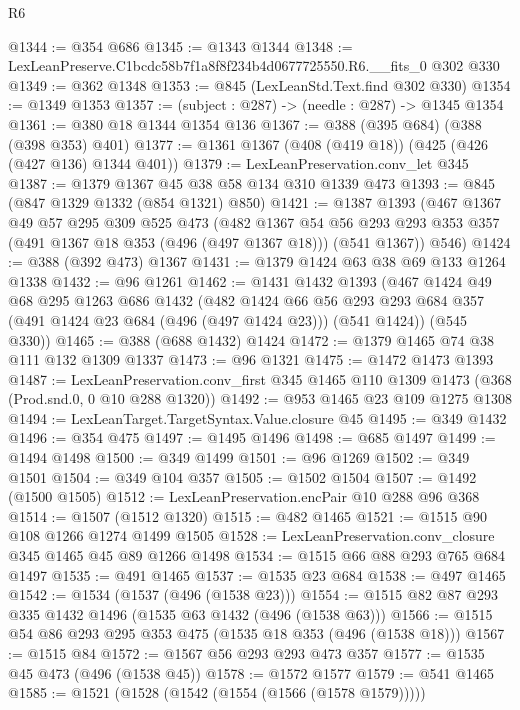 \begin{lexlean}{R6}
\begin{coremodule}
@1344 := @354 @686
@1345 := @1343 @1344
@1348 := LexLeanPreserve.C1bcdc58b7f1a8f8f234b4d0677725550.R6.__fits_0 @302 @330
@1349 := @362 @1348
@1353 := @845 (LexLeanStd.Text.find @302 @330)
@1354 := @1349 @1353
@1357 := (subject : @287) -> (needle : @287) -> @1345 @1354
@1361 := @380 @18 @1344 @1354 @136
@1367 := @388 (@395 @684) (@388 (@398 @353) @401)
@1377 := @1361 @1367 (@408 (@419 @18)) (@425 (@426 (@427 @136) @1344 @401))
@1379 := LexLeanPreservation.conv_let @345
@1387 := @1379 @1367 @45 @38 @58 @134 @310 @1339 @473
@1393 := @845 (@847 @1329 @1332 (@854 @1321) @850)
@1421 := @1387
    @1393
    (@467
      @1367
      @49
      @57
      @295
      @309
      @525
      @473
      (@482
        @1367
        @54
        @56
        @293
        @293
        @353
        @357
        (@491 @1367 @18 @353 (@496 (@497 @1367 @18)))
        (@541 @1367))
      @546)
@1424 := @388 (@392 @473) @1367
@1431 := @1379 @1424 @63 @38 @69 @133 @1264 @1338
@1432 := @96 @1261
@1462 := @1431
    @1432
    @1393
    (@467
      @1424
      @49
      @68
      @295
      @1263
      @686
      @1432
      (@482
        @1424
        @66
        @56
        @293
        @293
        @684
        @357
        (@491 @1424 @23 @684 (@496 (@497 @1424 @23)))
        (@541 @1424))
      (@545 @330))
@1465 := @388 (@688 @1432) @1424
@1472 := @1379 @1465 @74 @38 @111 @132 @1309 @1337
@1473 := @96 @1321
@1475 := @1472 @1473 @1393
@1487 := LexLeanPreservation.conv_first
    @345
    @1465
    @110
    @1309
    @1473
    (@368 (Prod.snd.{0, 0} @10 @288 @1320))
@1492 := @953 @1465 @23 @109 @1275 @1308
@1494 := LexLeanTarget.TargetSyntax.Value.closure @45
@1495 := @349 @1432
@1496 := @354 @475
@1497 := @1495 @1496
@1498 := @685 @1497
@1499 := @1494 @1498
@1500 := @349 @1499
@1501 := @96 @1269
@1502 := @349 @1501
@1504 := @349 @104 @357
@1505 := @1502 @1504
@1507 := @1492 (@1500 @1505)
@1512 := LexLeanPreservation.encPair @10 @288 @96 @368
@1514 := @1507 (@1512 @1320)
@1515 := @482 @1465
@1521 := @1515 @90 @108 @1266 @1274 @1499 @1505
@1528 := LexLeanPreservation.conv_closure @345 @1465 @45 @89 @1266 @1498
@1534 := @1515 @66 @88 @293 @765 @684 @1497
@1535 := @491 @1465
@1537 := @1535 @23 @684
@1538 := @497 @1465
@1542 := @1534 (@1537 (@496 (@1538 @23)))
@1554 := @1515 @82 @87 @293 @335 @1432 @1496 (@1535 @63 @1432 (@496 (@1538 @63)))
@1566 := @1515 @54 @86 @293 @295 @353 @475 (@1535 @18 @353 (@496 (@1538 @18)))
@1567 := @1515 @84
@1572 := @1567 @56 @293 @293 @473 @357
@1577 := @1535 @45 @473 (@496 (@1538 @45))
@1578 := @1572 @1577
@1579 := @541 @1465
@1585 := @1521 (@1528 (@1542 (@1554 (@1566 (@1578 @1579)))))

\end{coremodule}
\end{lexlean}
